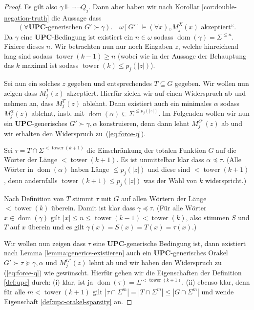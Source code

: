 \documentclass[nofonts]{uebung}
\theoremstyle{definition}
\DeclareMathOperator{\dom}{dom}
\DeclareMathOperator{\tower}{tower}
\begin{document}
\begin{proof}
    Es gilt also $\gamma\Vdash\neg\neg Q_j$. Dann aber haben wir nach Korollar \ref{cor:double-negation-truth} die Aussage dass
    \begin{equation} (\forall \text{$\mathbf{UPC}$-generischen $G'\succ \gamma$}).\quad  \omega[G'] \vDash (\forall x)\text{„$M_j^X(x)$ akzeptiert“}.\label{eq:force-q} \end{equation}
    Da $\gamma$ eine $\mathbf{UPC}$-Bedingung ist existiert ein $n\in\omega$ sodass $\dom(\gamma)=\Sigma^{\leq n}$. Fixiere dieses $n$.
    Wir betrachten nun nur noch Eingaben $z$, welche hinreichend lang sind sodass $\tower(k-1)\geq n$ (wobei wie in der Aussage der Behauptung das $k$ maximal ist sodass $\tower(k)\leq p_j(|z|)$). %

    Sei nun ein solches $z$ gegeben und entsprechendes $T\subseteq G$ gegeben.
    Wir wollen nun zeigen dass $M_j^T(z)$ akzeptiert. Hierfür zielen wir auf einen Widerspruch ab und nehmen an, dass $M_j^T(z)$ ablehnt.
    Dann existiert auch ein minimales $\alpha$ sodass $M_j^\alpha(z)$ ablehnt, insb. mit $\dom(\alpha)\subseteq\Sigma^{\leq p_j(|z|)}$. Im Folgenden wollen wir nun ein $\mathbf{UPC}$-generisches $G'\succ \gamma,\alpha$ konstruieren, denn dann lehnt $M_j^{G'}(z)$ ab und wir erhalten den Widerspruch zu~(\ref{eq:force-q}).

    Sei $\tau=T\cap \Sigma^{<\tower(k+1)}$ die Einschränkung der totalen Funktion $G$ auf die Wörter der Länge $< \tower(k+1)$.
    Es ist unmittelbar klar dass $\alpha\preceq\tau$. (Alle Wörter in $\dom(\alpha)$ haben Länge $\leq p_j(|z|)$ und diese sind $<\tower(k+1)$, denn andernfalls $\tower(k+1)\leq p_j(|z|)$ was der Wahl von $k$ widerspricht.)

    Nach Definition von $T$ stimmt $\tau$ mit $G$ auf allen Wörtern der Länge $<\tower(k)$ überein.
    Damit ist klar dass $\gamma\preceq \tau$. (Für alle Wörter $x\in\dom(\gamma)$ gilt $|x|\leq n\leq \tower(k-1)<\tower(k)$, also stimmen $S$ und $T$ auf $x$ überein und es gilt $\gamma(x)=S(x)=T(x)=\tau(x)$.)
    
    Wir wollen nun zeigen dass $\tau$ eine $\mathbf{UPC}$-generische Bedingung ist, dann existiert nach Lemma \ref{lemma:generics-existieren} auch ein $\mathbf{UPC}$-generisches Orakel $G'\succ \tau\succeq \gamma,\alpha$ und $M_j^{G'}(z)$ lehnt ab und wir haben den Widerspruch zu (\ref{eq:force-q}) wie gewünscht.
    Hierfür gehen wir die Eigenschaften der Definition \ref{def:upc} durch: (i) klar, ist ja $\dom(\tau)=\Sigma^{<\tower(k+1)}$.
    (ii) ebenso klar, denn für alle $m<\tower(k+1)$ gilt $|\tau\cap\Sigma^m|=|T\cap\Sigma^m|\leq |G\cap\Sigma^m|$ und wende Eigenschaft \ref{def:upc-orakel-sparsity} an.


\end{proof}
\end{document}
